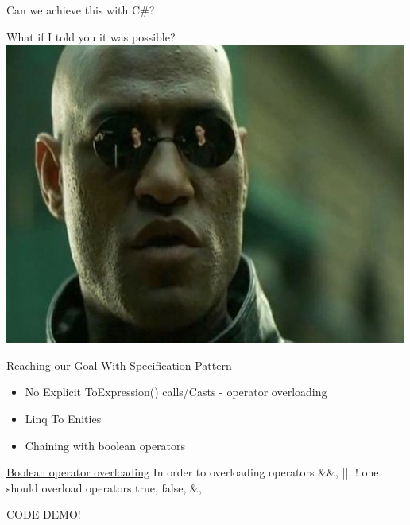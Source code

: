 \documentclass{bredelebeamer}
\newcommand{\imagefolder}{../EF.Experiments/EF.Experiments.Data/Specifications/Specification.cs}
\begin{document}
\begin{frame}{Can we achieve this with C\#?}
    \pause
    \begin{center}
        \huge What if I told you it was possible?
        \includegraphics[scale=0.45]{images/whatifitoldyou.jpg}
    \end{center}
\end{frame}

\begin{frame}[fragile]{Reaching our Goal With Specification Pattern}
    \begin{itemize}[<+->]
        \item {
            No Explicit ToExpression() calls/Casts - operator overloading
        }
        \item {
            Linq To Enities
        }
        \item {
            Chaining with boolean operators
        }
    \end{itemize}
     {
        
    }
     {
        
        
    }
     {
        \begin{exampleblock}{\href{https://docs.microsoft.com/en-us/dotnet/csharp/language-reference/language-specification/expressions\#boolean-expressions}{Boolean operator overloading}}
            In order to overloading operators \&\&, ||, ! one should overload operators true, false, \&, |
        \end{exampleblock}
        CODE DEMO!
    }

\end{frame}
\end{document}
